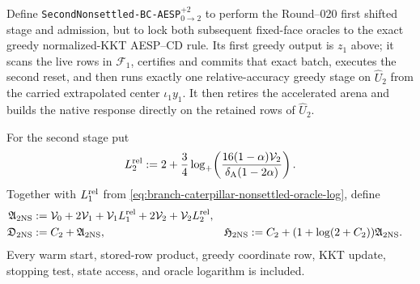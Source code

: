Define \texttt{SecondNonsettled-BC-AESP}$_{0\to2}^{+2}$ to perform the
Round--020 first shifted stage and admission, but to lock both subsequent
fixed-face oracles to the exact greedy normalized-KKT AESP--CD rule.  Its
first greedy output is $z_1$ above; it scans the live rows in $\mathcal F_1$,
certifies and commits that exact batch, executes the second reset, and then
runs exactly one relative-accuracy greedy stage on $\widehat U_2$ from the
carried extrapolated center $\iota_1y_1$.  It then retires the accelerated
arena and builds the native response directly on the retained rows of
$\widehat U_2$.

For the second stage put
\begin{equation}
 L_2^{\rm rel}:=2+\frac34\log_+\!\left(
 \frac{16(1-\alpha)\mathcal V_2}
      {\delta_{\rm A}(1-2\alpha)}\right).
 \label{eq:branch-caterpillar-two-nonsettled-oracle-log}
\end{equation}
Together with $L_1^{\rm rel}$ from
\cref{eq:branch-caterpillar-nonsettled-oracle-log}, define
\begin{align}
 \mathfrak A_{\rm 2NS}
 &:=\mathcal V_0+2\mathcal V_1+\mathcal V_1L_1^{\rm rel}
    +2\mathcal V_2+\mathcal V_2L_2^{\rm rel},
 \notag\\
 \mathfrak D_{\rm 2NS}&:=C_2+\mathfrak A_{\rm 2NS},
 &\mathfrak H_{\rm 2NS}
 &:=C_2+(1+\log(2+C_2))\mathfrak A_{\rm 2NS}.
 \label{eq:branch-caterpillar-two-nonsettled-budgets}
\end{align}
Every warm start, stored-row product, greedy coordinate row, KKT update,
stopping test, state access, and oracle logarithm is included.

